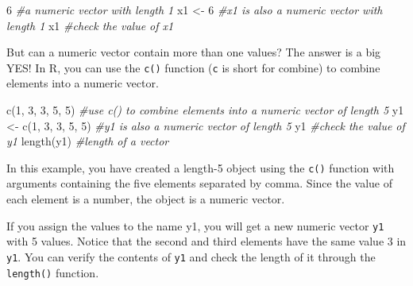 \documentclass[
]{book}
\newenvironment{Shaded}{\begin{snugshade}}{\end{snugshade}}
\newcommand{\CommentTok}[1]{\textcolor[rgb]{0.56,0.35,0.01}{\textit{#1}}}
\newcommand{\DecValTok}[1]{\textcolor[rgb]{0.00,0.00,0.81}{#1}}
\newcommand{\FunctionTok}[1]{\textcolor[rgb]{0.00,0.00,0.00}{#1}}
\newcommand{\NormalTok}[1]{#1}
\newcommand{\OtherTok}[1]{\textcolor[rgb]{0.56,0.35,0.01}{#1}}
\begin{document}
\begin{Shaded}
\begin{Highlighting}[]
\DecValTok{6}                         \CommentTok{\#a numeric vector with length 1}
\NormalTok{x1 }\OtherTok{\textless{}{-}} \DecValTok{6}                   \CommentTok{\#x1 is also a numeric vector with length 1}
\NormalTok{x1                        }\CommentTok{\#check the value of x1}
\end{Highlighting}
\end{Shaded}

But can a numeric vector contain more than one values? The answer is a big YES! In R, you can use the \texttt{c()} function (\texttt{c} is short for combine) to combine elements into a numeric vector.

\begin{Shaded}
\begin{Highlighting}[]
\FunctionTok{c}\NormalTok{(}\DecValTok{1}\NormalTok{, }\DecValTok{3}\NormalTok{, }\DecValTok{3}\NormalTok{, }\DecValTok{5}\NormalTok{, }\DecValTok{5}\NormalTok{)          }\CommentTok{\#use c() to combine elements into a numeric vector of length 5}
\NormalTok{y1 }\OtherTok{\textless{}{-}} \FunctionTok{c}\NormalTok{(}\DecValTok{1}\NormalTok{, }\DecValTok{3}\NormalTok{, }\DecValTok{3}\NormalTok{, }\DecValTok{5}\NormalTok{, }\DecValTok{5}\NormalTok{)    }\CommentTok{\#y1 is also a numeric vector of length 5}
\NormalTok{y1                        }\CommentTok{\#check the value of y1}
\FunctionTok{length}\NormalTok{(y1)                }\CommentTok{\#length of a vector}
\end{Highlighting}
\end{Shaded}

In this example, you have created a length-5 object using the \texttt{c()} function with arguments containing the five elements separated by comma. Since the value of each element is a number, the object is a numeric vector.

If you assign the values to the name y1, you will get a new numeric vector \texttt{y1} with 5 values. Notice that the second and third elements have the same value 3 in \texttt{y1}. You can verify the contents of \texttt{y1} and check the length of it through the \texttt{length()} function.
\end{document}
